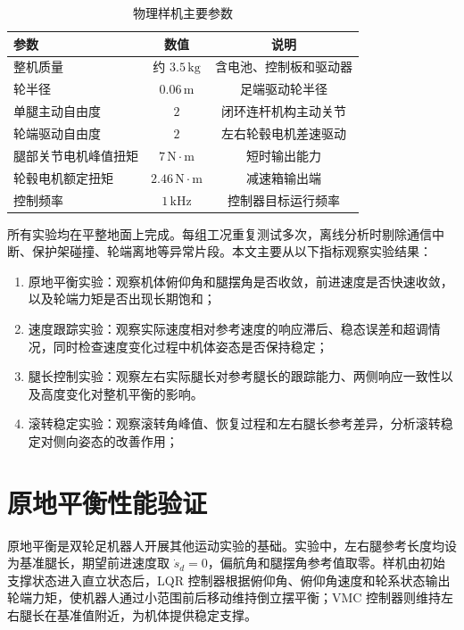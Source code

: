 \begin{table}[H]
  \centering
  \caption{物理样机主要参数}\label{tab:prototype-parameters}
  \renewcommand{\arraystretch}{1.25}
  \begin{tabular}{lcc}
    \toprule
    参数 & 数值 & 说明 \\
    \midrule
    整机质量 & 约 $3.5\,\mathrm{kg}$ & 含电池、控制板和驱动器 \\
    轮半径 & $0.06\,\mathrm{m}$ & 足端驱动轮半径 \\
    单腿主动自由度 & $2$ & 闭环连杆机构主动关节 \\
    轮端驱动自由度 & $2$ & 左右轮毂电机差速驱动 \\
    腿部关节电机峰值扭矩 & $7\,\mathrm{N\cdot m}$ & 短时输出能力 \\
    轮毂电机额定扭矩 & $2.46\,\mathrm{N\cdot m}$ & 减速箱输出端 \\
    控制频率 & $1\,\mathrm{kHz}$ & 控制器目标运行频率 \\
    \bottomrule
  \end{tabular}
\end{table}

所有实验均在平整地面上完成。每组工况重复测试多次，离线分析时剔除通信中断、保护架碰撞、轮端离地等异常片段。本文主要从以下指标观察实验结果：

\begin{enumerate}
  \item 原地平衡实验：观察机体俯仰角和腿摆角是否收敛，前进速度是否快速收敛，以及轮端力矩是否出现长期饱和；
  \item 速度跟踪实验：观察实际速度相对参考速度的响应滞后、稳态误差和超调情况，同时检查速度变化过程中机体姿态是否保持稳定；
  \item 腿长控制实验：观察左右实际腿长对参考腿长的跟踪能力、两侧响应一致性以及高度变化对整机平衡的影响。
  \item 滚转稳定实验：观察滚转角峰值、恢复过程和左右腿长参考差异，分析滚转稳定对侧向姿态的改善作用；
\end{enumerate}

\section{原地平衡性能验证}

原地平衡是双轮足机器人开展其他运动实验的基础。实验中，左右腿参考长度均设为基准腿长，期望前进速度取 $\dot{s}_d=0$，偏航角和腿摆角参考值取零。样机由初始支撑状态进入直立状态后，LQR 控制器根据俯仰角、俯仰角速度和轮系状态输出轮端力矩，使机器人通过小范围前后移动维持倒立摆平衡；VMC 控制器则维持左右腿长在基准值附近，为机体提供稳定支撑。

